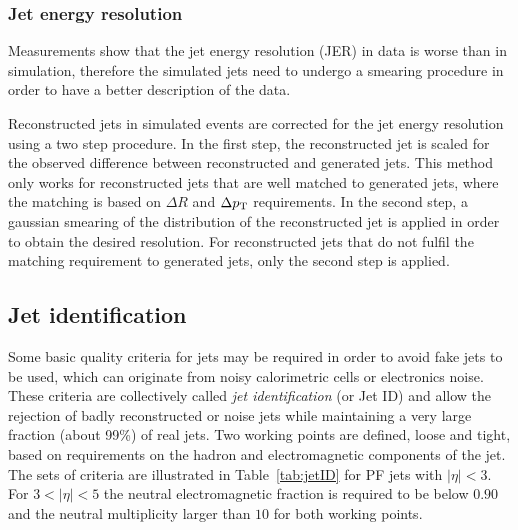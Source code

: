 \subsubsection{Jet energy resolution}
Measurements show that the jet energy resolution (JER) in data is worse than in simulation, therefore the simulated jets need to undergo a smearing procedure in order to have a better description of the data. 

Reconstructed jets in simulated events are corrected for the jet energy resolution using a two step procedure. In the first step, the reconstructed jet \pt is scaled for the observed \pt difference between reconstructed and generated jets. This method only works for reconstructed jets that are well matched to generated jets, where the matching is based on $\Delta R$ and $\Delta p_\mathrm{T}$ requirements. In the second step, a gaussian smearing of the \pt distribution of the reconstructed jet is applied in order to obtain the desired resolution. For reconstructed jets that do not fulfil the matching requirement to generated jets, only the second step is applied.

\subsection{Jet identification}\label{sec:jetID}

Some basic quality criteria for jets may be required in order to avoid fake jets to be used, which can originate from noisy calorimetric cells or electronics noise. These criteria are collectively called \emph{jet identification} (or Jet ID) and allow the rejection of badly reconstructed or noise jets while maintaining a very large fraction (about 99\%) of real jets. Two working points are defined, loose and tight, based on requirements on the hadron and electromagnetic components of the jet. The sets of criteria are illustrated in Table~\ref{tab:jetID} for PF jets with $|\eta|<3$. For $3<|\eta|<5$ the neutral electromagnetic fraction is required to be below $0.90$ and the neutral multiplicity larger than $10$ for both working points.

